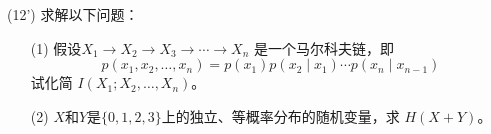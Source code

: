 \documentclass[12pt,a4paper,openany,twoside]{ctexbook}
\begin{document}
\begin{exercise}(12')
	求解以下问题：
\begin{itemize}
	\item [(1)] 假设$X_{1} \rightarrow X_{2} \rightarrow X_{3} \rightarrow \cdots \rightarrow X_{n}$ 是一个马尔科夫链，即
	$$
	p\left(x_{1}, x_{2}, \ldots, x_{n}\right)=p\left(x_{1}\right) p\left(x_{2} \mid x_{1}\right) \cdots p\left(x_{n} \mid x_{n-1}\right)
	$$
	试化简 $I\left(X_{1} ; X_{2}, \ldots, X_{n}\right)$。
	\item [(2)] $X$和$Y$是$\{0,1,2,3\}$上的独立、等概率分布的随机变量，求 $H(X+Y)$。
\end{itemize}

\end{exercise}
%	
%	
%	
%	
%	
%	
\end{document}
